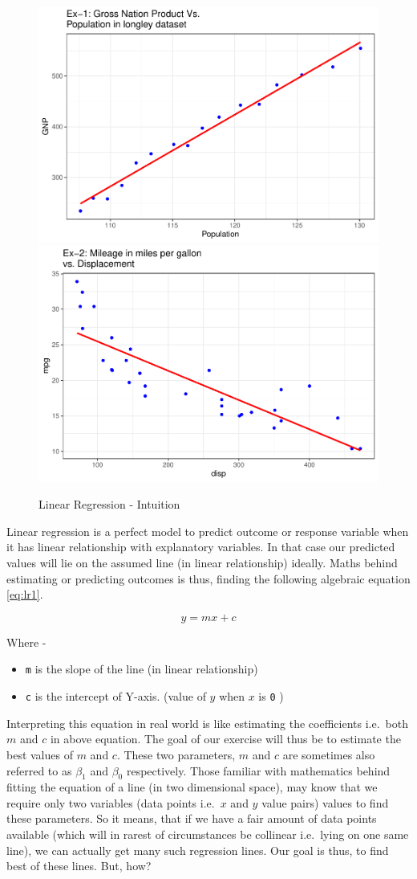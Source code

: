 \documentclass[
]{book}
\providecommand{\tightlist}{%
  \setlength{\itemsep}{0pt}\setlength{\parskip}{0pt}}
\begin{document}
\begin{figure}

{\centering \includegraphics[width=0.47\linewidth,height=0.45\textheight]{DauR_files/figure-latex/concept-1} \includegraphics[width=0.47\linewidth,height=0.45\textheight]{DauR_files/figure-latex/concept-2} 

}

\caption{Linear Regression - Intuition}\label{fig:concept}
\end{figure}

Linear regression is a perfect model to predict outcome or response variable when it has linear relationship with explanatory variables. In that case our predicted values will lie on the assumed line (in linear relationship) ideally. Maths behind estimating or predicting outcomes is thus, finding the following algebraic equation \eqref{eq:lr1}.

\begin{equation} 
y = mx + c
\label{eq:lr1}
\end{equation}

Where -

\begin{itemize}
\tightlist
\item
  \texttt{m} is the slope of the line (in linear relationship)
\item
  \texttt{c} is the intercept of Y-axis. (value of \(y\) when \(x\) is \texttt{0} )
\end{itemize}

Interpreting this equation in real world is like estimating the coefficients i.e.~both \(m\) and \(c\) in above equation. The goal of our exercise will thus be to estimate the best values of \(m\) and \(c\). These two parameters, \(m\) and \(c\) are sometimes also referred to as \(\beta_1\) and \(\beta_0\) respectively. Those familiar with mathematics behind fitting the equation of a line (in two dimensional space), may know that we require only two variables (data points i.e.~\(x\) and \(y\) value pairs) values to find these parameters. So it means, that if we have a fair amount of data points available (which will in rarest of circumstances be collinear i.e.~lying on one same line), we can actually get many such regression lines. Our goal is thus, to find best of these lines. But, how?
\end{document}
